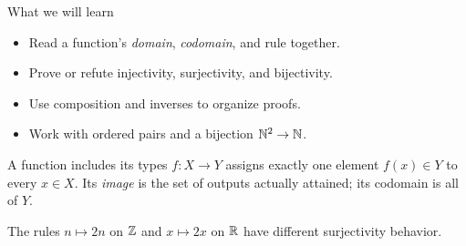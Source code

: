 

\begin{frame}
  \titlepage
\end{frame}

\begin{frame}{What we will learn}
\begin{itemize}
  \item Read a function's \emph{domain}, \emph{codomain}, and rule together.
  \item Prove or refute injectivity, surjectivity, and bijectivity.
  \item Use composition and inverses to organize proofs.
  \item Work with ordered pairs and a bijection $\mathbb{N}^2\to\mathbb{N}$.
\end{itemize}
\begin{block}{A function includes its types}
$f:X\to Y$ assigns exactly one element $f(x)\in Y$ to every $x\in X$.
Its \emph{image} is the set of outputs actually attained; its codomain is all of $Y$.
\end{block}
The rules $n\mapsto 2n$ on $\mathbb{Z}$ and $x\mapsto 2x$ on $\mathbb{R}$ have different surjectivity behavior.
\end{frame}

